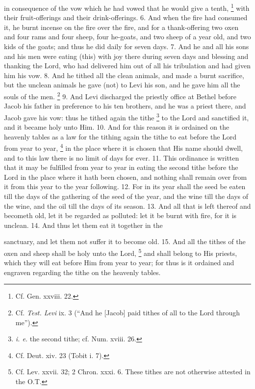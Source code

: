 in consequence of the vow which he had vowed that he would give a tenth, \footnote{Cf. Gen. xxviii. 22.} with their fruit-offerings and their drink-offerings. 6. And when the fire had consumed it, he burnt incense on the fire over the fire, and for a thank-offering two oxen and four rams and four sheep, four he-goats, and two sheep of a year old, and two kids of the goats; and thus he did daily for seven days. 7. And he and all his sons and his men were eating (this) with joy there during seven days and blessing and thanking the Lord, who had delivered him out of all his tribulation and had given him his vow. 8. And he tithed all the clean animals, and made a burnt sacrifice, but the unclean animals he gave (not) to Levi his son, and he gave him all the souls of the men. \footnote{Cf. \emph{Test. Levi} ix. 3 (``And he [Jacob] paid tithes of all to the Lord through me'').} 9. And Levi discharged the priestly office at Bethel before Jacob his father in preference to his ten brothers, and he was a priest there, and Jacob gave his vow: thus he tithed again the tithe \footnote{\emph{i. e.} the second tithe; cf. Num. xviii. 26.} to the Lord and sanctified it, and it became holy unto Him. 10. And for this reason it is ordained on the heavenly tables as a law for the tithing again the tithe to eat before the Lord from year to year, \footnote{Cf. Deut. xiv. 23 (Tobit i. 7).} in the place where it is chosen that His name should dwell, and to this law there is no limit of days for ever. 11. This ordinance is written that it may be fulfilled from year to year in eating the second tithe before the Lord in the place where it hath been chosen, and nothing shall remain over from it from this year to the year following. 12. For in its year shall the seed be eaten till the days of the gathering of the seed of the year, and the wine till the days of the wine, and the oil till the days of its season. 13. And all that is left thereof and becometh old, let it be regarded as polluted: let it be burnt with fire, for it is unclean. 14. And thus let them eat it together in the

sanctuary, and let them not suffer it to become old. 15. And all the tithes of the oxen and sheep shall be holy unto the Lord, \footnote{Cf. Lev. xxvii. 32; 2 Chron. xxxi. 6. These tithes are not otherwise attested in the O.T.} and shall belong to His priests, which they will eat before Him from year to year; for thus is it ordained and engraven regarding the tithe on the heavenly tables.


